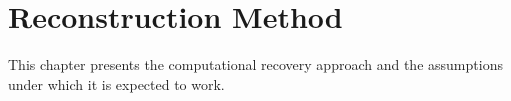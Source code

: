\chapter{Reconstruction Method}

This chapter presents the computational recovery approach and the assumptions
under which it is expected to work.

